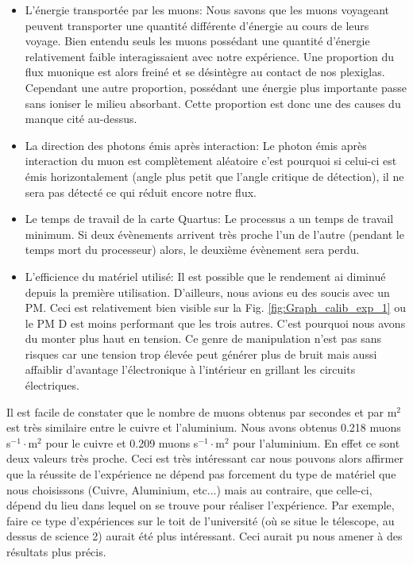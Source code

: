 \documentclass[12pt]{article}
\begin{document}
\begin{itemize}
    
    \item L'énergie transportée par les muons: Nous savons que les muons voyageant peuvent transporter une quantité différente d'énergie au cours de leurs voyage. Bien entendu seuls les muons possédant une quantité d'énergie relativement faible interagissaient avec notre expérience. Une proportion du flux muonique est alors freiné et se désintègre au contact de nos plexiglas. Cependant une autre proportion, possédant une énergie plus importante passe sans ioniser le milieu absorbant. Cette proportion est donc une des causes du manque cité au-dessus.
    
    \item La direction des photons émis après interaction: Le photon émis après interaction du muon est complètement aléatoire c'est pourquoi si celui-ci est émis horizontalement (angle plus petit que l'angle critique de détection), il ne sera pas détecté ce qui réduit encore notre flux.
    
    \item Le temps de travail de la carte Quartus: Le processus a un temps de travail minimum. Si deux évènements arrivent très proche l'un de l'autre (pendant le temps mort du processeur) alors, le deuxième évènement sera perdu.
    
    \item L'efficience du matériel utilisé: Il est possible que le rendement ai diminué depuis la première utilisation. D'ailleurs, nous avions eu des soucis avec un PM. Ceci est relativement bien visible sur la Fig. \ref{fig:Graph_calib_exp_1} ou le PM D est moins performant que les trois autres. C'est pourquoi nous avons du monter plus haut en tension. Ce genre de manipulation n'est pas sans risques car une tension trop élevée peut générer plus de bruit mais aussi affaiblir d'avantage l'électronique à l'intérieur en grillant les circuits électriques.
\end{itemize}

    Il est facile de constater que le nombre de muons obtenus par secondes et par m$^{2}$ est très similaire entre le cuivre et l'aluminium. Nous avons obtenus 0.218 muons s$^{-1}\cdot$m$^{2}$ pour le cuivre et 0.209 muons s$^{-1}\cdot$m$^{2}$ pour l'aluminium. En effet ce sont deux valeurs très proche. Ceci est très intéressant car nous pouvons alors affirmer que la réussite de l'expérience ne dépend pas forcement du type de matériel que nous choisissons (Cuivre, Aluminium, etc...) mais au contraire, que celle-ci, dépend du lieu dans lequel on se trouve pour réaliser l'expérience. Par exemple, faire ce type d'expériences sur le toit de l'université (où se situe le télescope, au dessus de science 2) aurait été plus intéressant. Ceci aurait pu nous amener à des résultats plus précis. 
\end{document}
